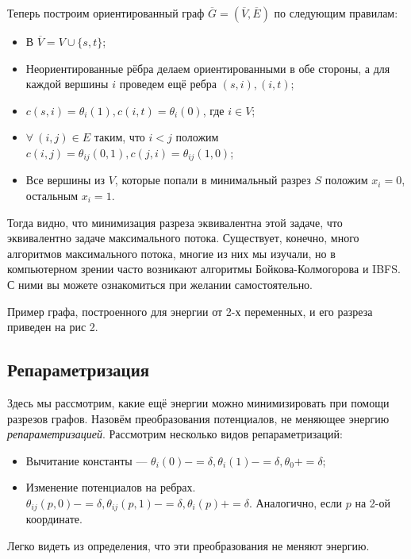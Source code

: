 Теперь построим ориентированный граф $\overline{G} = (\overline{V}, \overline{E})$
по следующим правилам:

\begin{itemize}
  \item В $\overline{V} = V \cup \{s, t\}$;
  \item Неориентированные рёбра делаем ориентированными в обе
  стороны, а для каждой вершины
  $i$ проведем ещё ребра $(s, i), (i, t)$;
  \item $c(s, i) = \theta_i(1), c(i, t) = \theta_i(0)$, где $i \in V$;
  \item $\forall \ (i, j) \in E$ таким, что $i < j$ положим $c(i, j) =\theta_{ij}(0, 1), c(j, i) = \theta_{ij}(1, 0)$;
  \item Все вершины из $V$, которые попали в минимальный разрез $S$ положим $x_i = 0$,
  остальным $x_i = 1$.
\end{itemize}

Тогда видно, что минимизация разреза эквивалентна этой задаче, что эквивалентно
задаче максимального потока. Существует, конечно, много алгоритмов максимального
потока, многие из них мы изучали, но в компьютерном зрении часто возникают алгоритмы
Бойкова-Колмогорова и IBFS. С ними вы можете ознакомиться при желании самостоятельно.

Пример графа, построенного для энергии от 2-х переменных, и его разреза 
приведен на рис 2.

\subsection{Репараметризация}

Здесь мы рассмотрим, какие ещё энергии можно минимизировать при помощи
разрезов графов. Назовём преобразования потенциалов, не меняющее энергию 
\textit{репараметризацией}. Рассмотрим несколько видов репараметризаций:

\begin{itemize}
  \item Вычитание константы --- $\theta_i(0) \mathrel{{-}{=}} \delta, \theta_i(1) \mathrel{{-}{=}} \delta,
  \theta_0 \mathrel{{+}{=}} \delta$;
  \item Изменение потенциалов на ребрах. $\theta_{ij}(p, 0) \mathrel{{-}{=}} \delta, 
  \theta_{ij}(p, 1) \mathrel{{-}{=}} \delta, \theta_i(p) \mathrel{{+}{=}} \delta$. Аналогично, если
  $p$ на 2-ой координате.
\end{itemize}

Легко видеть из определения, что эти преобразования не меняют энергию.

